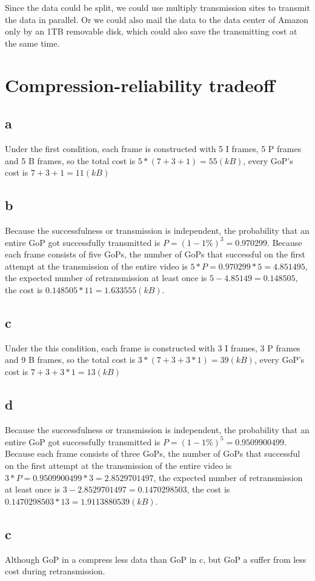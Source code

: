 \documentclass[12pt,a4paper]{article}
\begin{document}
Since the data could be split, we could use multiply transmission sites to transmit the data in parallel. Or we could also mail the data to the data center of Amazon only by an 1TB removable disk, which could also save the transmitting cost at the same time.

\section{Compression-reliability tradeoff}

\subsection{a}
Under the first condition, each frame is constructed with 5 I frames, 5 P frames and 5 B frames, so the total cost is $ 5 * (7 + 3 + 1) = 55 (kB) $, every GoP's cost is $ 7 + 3 + 1 = 11 (kB)$

\subsection{b}
Because the successfulness or transmission is independent, the probability that an entire GoP got successfully transmitted is $P = (1-1\%)^3 = 0.970299$. Because each frame consists of five GoPs,  the number of GoPs that successful on the first attempt at the transmission of the entire video is $5 * P = 0.970299 * 5 = 4.851495$, the expected number of retransmission at least once is $5 - 4.85149 = 0.148505$, the cost is $0.148505 * 11 = 1.633555 (kB)$.

\subsection{c}
Under the this condition, each frame is constructed with 3 I frames, 3 P frames and 9 B frames, so the total cost is $ 3 * (7 + 3 + 3*1) = 39 (kB) $, every GoP's cost is $ 7 + 3 + 3*1 = 13 (kB)$

\subsection{d}
Because the successfulness or transmission is independent, the probability that an entire GoP got successfully transmitted is $P = (1-1\%)^5 =0.9509900499$. Because each frame consists of three GoPs,  the number of GoPs that successful on the first attempt at the transmission of the entire video is $3 * P =0.9509900499* 3 = 2.8529701497$, the expected number of retransmission at least once is $3 -2.8529701497= 0.1470298503$, the cost is $0.1470298503 * 13 = 1.9113880539 (kB)$.

\subsection{c}

Although GoP in a compress less data than GoP in c, but GoP a suffer from less cost during retransmission.
\end{document}
